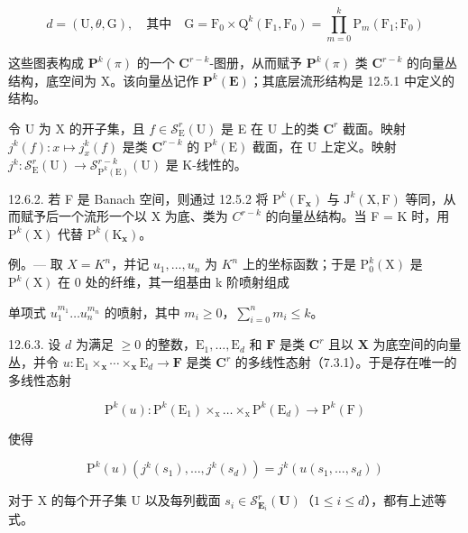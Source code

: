 \[
d = (\mathrm{U}, \theta, \mathrm{G}), \quad \text{其中}\quad \mathrm{G} = \mathrm{F}_{0}\times\mathrm{Q}^{k}(\mathrm{F}_{1},\mathrm{F}_{0}) = \prod_{m=0}^{k}\mathrm{P}_{m}(\mathrm{F}_{1};\mathrm{F}_{0})
\]

这些图表构成 \(\mathbf{P}^{k}(\pi)\) 的一个 \(\mathbf{C}^{r - k}\)-图册，从而赋予 \(\mathbf{P}^{k}(\pi)\) 类 \(\mathbf{C}^{r - k}\) 的向量丛结构，底空间为 X。该向量丛记作 \(\mathbf{P}^{k}(\mathbf{E})\)；其底层流形结构是 12.5.1 中定义的结构。

令 U 为 X 的开子集，且 \(f \in \mathcal{S}_{\mathrm{E}}^{r}(\mathrm{U})\) 是 E 在 U 上的类 \(\mathbf{C}^{r}\) 截面。映射 \(j^{k}(f): x \mapsto j_{x}^{k}(f)\) 是类 \(\mathbf{C}^{r - k}\) 的 \(\mathrm{P}^{k}(\mathrm{E})\) 截面，在 U 上定义。映射 \(j^{k}: \mathcal{S}_{\mathrm{E}}^{r}(\mathrm{U}) \to \mathcal{S}_{\mathrm{P}^{k}(\mathrm{E})}^{r - k}(\mathrm{U})\) 是 K-线性的。

12.6.2. 若 F 是 Banach 空间，则通过 12.5.2 将 \(\mathrm{P}^{k}(\mathrm{F}_{\mathbf{x}})\) 与 \(\mathrm{J}^{k}(\mathrm{X},\mathrm{F})\) 等同，从而赋予后一个流形一个以 X 为底、类为 \(C^{r-k}\) 的向量丛结构。当 F = K 时，用 \(\mathrm{P}^{k}(\mathrm{X})\) 代替 \(\mathrm{P}^{k}(\mathrm{K}_{\mathbf{x}})\)。

例。--- 取 \(X = K^{n}\)，并记 \(u_{1}, \ldots, u_{n}\) 为 \(K^{n}\) 上的坐标函数；于是 \(\mathrm{P}_{0}^{k}(\mathrm{X})\) 是 \(\mathrm{P}^{k}(\mathrm{X})\) 在 0 处的纤维，其一组基由 k 阶喷射组成

单项式 \(u_{1}^{m_1} \ldots u_{n}^{m_n}\) 的喷射，其中 \(m_i \geqslant 0\)，\(\sum_{i=0}^{n} m_i \leqslant k\)。

12.6.3. 设 \(d\) 为满足 \(\geqslant 0\) 的整数，\(\mathrm{E}_{1},\ldots,\mathrm{E}_{d}\) 和 \(\mathbf{F}\) 是类 \(\mathbf{C}^{r}\) 且以 \(\mathbf{X}\) 为底空间的向量丛，并令 \(u\colon\mathrm{E}_{1}\times_{\mathbf{x}}\cdots\times_{\mathbf{x}}\mathrm{E}_{d}\to\mathbf{F}\) 是类 \(\mathbf{C}^{r}\) 的多线性态射（7.3.1）。于是存在唯一的多线性态射

\[
\mathrm{P} ^ {k} (u) \colon \mathrm{P} ^ {k} (\mathrm{E} _ {1}) \times_ {\mathrm{x}} \dots \times_ {\mathrm{x}} \mathrm{P} ^ {k} (\mathrm{E} _ {d}) \rightarrow \mathrm{P} ^ {k} (\mathrm{F})
\]

使得

\[
\mathrm{P} ^ {k} (u) \left(j ^ {k} \left(s _ {1}\right), \dots , j ^ {k} \left(s _ {d}\right)\right) = j ^ {k} \left(u \left(s _ {1}, \dots , s _ {d}\right)\right)
\]

对于 X 的每个开子集 U 以及每列截面 \(s_i \in \mathcal{S}_{\mathbf{E}_i}^r(\mathbf{U})\)（\(1 \leqslant i \leqslant d\)），都有上述等式。

